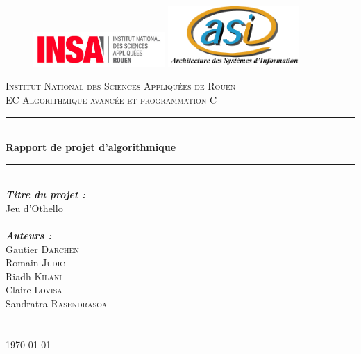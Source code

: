 \documentclass[11pt]{report}
\begin{document}
\renewcommand{\tt}[1]{\og \texttt{#1} \fg}


\begin{titlepage}
\thispagestyle{empty}
\begin{figure}
	\includegraphics[width=5cm]{Illustrations/Insa.png}\hfill
	\includegraphics[width=5cm]{Illustrations/ASI.png}\
\end{figure}

\newcommand{\HRule}{\rule{\linewidth}{0.5mm}} 
\center 
{}\textsc{\huge Institut National des Sciences Appliqu\'{e}es de Rouen}\\[1.5cm] 
\textsc{\Large EC Algorithmique avancée et programmation C}\\[2cm] 

\HRule \\[0.4cm]
{ \huge \bfseries Rapport de projet d'algorithmique}\\[0.2cm] 
\HRule \\[2.5cm]
 
\LARGE \emph{\textbf{Titre du projet : }}\\
\LARGE{ \og Jeu d'Othello \fg}\\
~\\[2cm] 


\large \emph{\textbf{Auteurs :}}\\
Gautier \textsc{Darchen}\\ 
Romain \textsc{Judic}\\
Riadh \textsc{Kilani}\\
Claire \textsc{Lovisa}\\
Sandratra \textsc{Rasendrasoa}\\

~\\ ~\\[1cm]

\vfill{\today}\\[3cm]

\end{titlepage}
\end{document}

